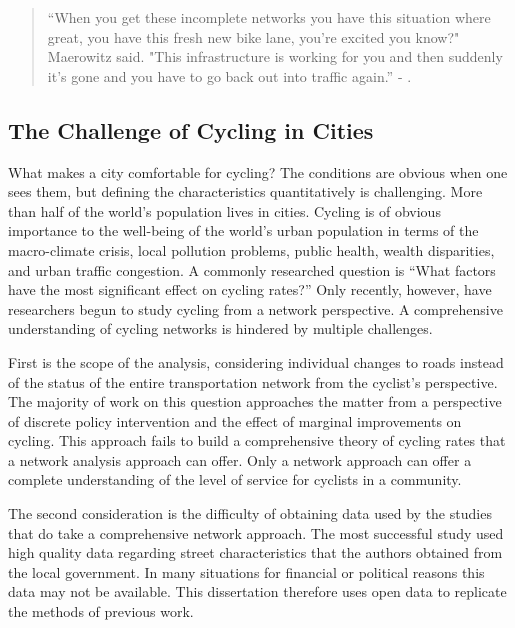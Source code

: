 

\begin{quote}
``When you get these incomplete networks you have this situation where great, you have this fresh new bike lane, you're excited you know?" Maerowitz said. "This infrastructure is working for you and then suddenly it's gone and you have to go back out into traffic again.'' - \cite{juhasz2019}.
\end{quote}
 
\subsection{The Challenge of Cycling in Cities}

What makes a city comfortable for cycling? The conditions are obvious when one sees them, but defining the characteristics quantitatively is challenging. More than half of the world's population lives in cities\parencite{half}. Cycling is of obvious importance to the well-being of the world's  urban population in terms of the macro-climate crisis, local pollution problems,  public health, wealth disparities, and urban traffic congestion. A commonly researched question is ``What factors have the most significant effect on cycling rates?'' Only recently, however, have researchers begun to study cycling from a network perspective. A comprehensive understanding of cycling networks is hindered by multiple challenges. 


First is the scope of the analysis, considering individual changes to roads instead of the status of the entire transportation network from the cyclist's perspective.  The majority of work on this question approaches the matter from a perspective of discrete policy intervention and the effect of marginal improvements on cycling. This approach fails to build a comprehensive theory of cycling rates that a network analysis approach can offer. Only a network approach can offer a complete understanding of the level of service for cyclists in a community. 

The second consideration is the difficulty of obtaining data used by the studies that do take a comprehensive network approach. The most successful study used high quality data regarding street characteristics that the authors obtained from the local government. In many situations for financial or political reasons this data may not be available. This dissertation therefore uses open data to replicate the methods of previous work. 

